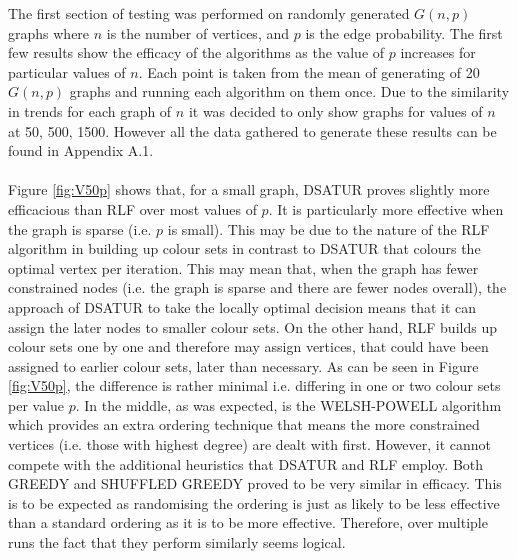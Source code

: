 The first section of testing was performed on randomly generated $G(n, p)$ graphs where $n$ is the number of vertices, and $p$ is the edge probability. The first few results show the efficacy of the algorithms as the value of $p$ increases for particular values of $n$. Each point is taken from the mean of generating of 20 $G(n,p)$ graphs and running each algorithm on them once. Due to the similarity in trends for each graph of $n$ it was decided to only show graphs for values of $n$ at 50, 500, 1500. However all the data gathered to generate these results can be found in Appendix A.1. 
\\\\
Figure \ref{fig:V50p} shows that, for a small graph, DSATUR proves slightly more efficacious than RLF over most values of $p$. It is particularly more effective when the graph is sparse (i.e. $p$ is small). This may be due to the nature of the RLF algorithm in building up colour sets in contrast to DSATUR that colours the optimal vertex per iteration. This may mean that, when the graph has fewer constrained nodes (i.e. the graph is sparse and there are fewer nodes overall), the approach of DSATUR to take the locally optimal decision means that it can assign the later nodes to smaller colour sets. On the other hand, RLF builds up colour sets one by one and therefore may assign vertices, that could have been assigned to earlier colour sets, later than necessary. As can be seen in Figure \ref{fig:V50p}, the difference is rather minimal i.e. differing in one or two colour sets per value $p$. In the middle, as was expected, is the WELSH-POWELL algorithm which provides an extra ordering technique that means the more constrained vertices (i.e. those with highest degree) are dealt with first. However, it cannot compete with the additional heuristics that DSATUR and RLF employ. Both GREEDY and SHUFFLED GREEDY proved to be very similar in efficacy. This is to be expected as randomising the ordering is just as likely to be less effective than a standard ordering as it is to be more effective. Therefore, over multiple runs the fact that they perform similarly seems logical. 
